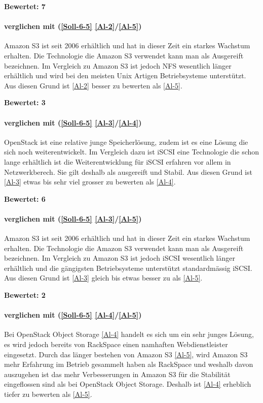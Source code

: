  \textbf{Bewertet: 7}

\paragraph*{  verglichen mit  (\ref{Soll-6-5} \ref{Al-2}/\ref{Al-5})}
Amazon S3 ist seit 2006 erhältlich und hat in dieser Zeit ein starkes Wachstum erhalten. Die Technologie die Amazon S3 verwendet kann man als Ausgereift bezeichnen. Im Vergleich zu Amazon S3 ist jedoch NFS wesentlich länger erhältlich und wird bei den meisten Unix Artigen Betriebsysteme unterstützt.
Aus diesen Grund ist  \ref{Al-2} besser zu bewerten als \ref{Al-5}.

 \textbf{Bewertet: 3}

\paragraph*{  verglichen mit  (\ref{Soll-6-5} \ref{Al-3}/\ref{Al-4})}
OpenStack ist eine relative junge Speicherlösung, zudem ist es eine Lösung die sich noch weiterentwickelt. Im Vergleich dazu ist iSCSI eine Technologie die schon lange erhältlich ist die Weiterentwicklung für iSCSI erfahren vor allem in Netzwerkberech. Sie gilt deshalb als ausgereift und Stabil.
Aus diesen Grund ist  \ref{Al-3} etwas bis sehr viel grosser zu bewerten als  \ref{Al-4}.

 \textbf{Bewertet: 6}

\paragraph*{  verglichen mit  (\ref{Soll-6-5} \ref{Al-3}/\ref{Al-5})}
Amazon S3 ist seit 2006 erhältlich und hat in dieser Zeit ein starkes Wachstum erhalten. Die Technologie die Amazon S3 verwendet kann man als Ausgereift bezeichnen. Im Vergleich zu Amazon S3 ist jedoch iSCSI wesentlich länger erhältlich und die gängigsten Betriebsysteme unterstützt standardmässig iSCSI. 
Aus diesen Grund ist  \ref{Al-3} gleich bis etwas besser zu als \ref{Al-5}.

 \textbf{Bewertet: 2}

\paragraph*{  verglichen mit  (\ref{Soll-6-5} \ref{Al-4}/\ref{Al-5})}
Bei OpenStack Object Storage \ref{Al-4} handelt es sich um ein sehr junges Lösung, es wird jedoch bereits von RackSpace einen namhaften Webdienstleister eingesetzt. Durch das länger bestehen von Amazon S3 \ref{Al-5}, wird Amazon S3 mehr Erfahrung im Betrieb gesammelt haben als RackSpace und weshalb davon auszugehen ist das mehr Verbesserungen in Amazon S3 für die Stabilität eingeflossen sind als bei OpenStack Object Storage. Deshalb ist \ref{Al-4} erheblich tiefer zu bewerten als \ref{Al-5}.

